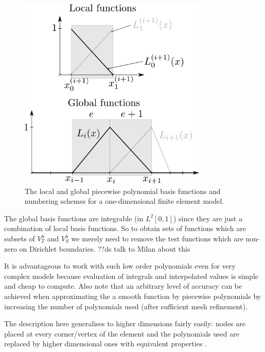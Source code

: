 \begin{figure}
  \center
  \includegraphics[width=0.8\textwidth]{./images/local_global_functions}
  \caption{The local and global piecewise polynomial basis functions and numbering schemes for a one-dimensional finite element model.   %
  }
  \label{fig:local_global_functions}
\end{figure}

The global basis functions are integrable (\ie in $L^2[0,1]$) since they are just a combination of local basis functions.
So to obtain sets of functions which are subsets of $V_T^h$ and $V_S^h$ we merely need to remove the test functions which are non-zero on Dirichlet boundaries.
??ds talk to Milan about this

It is advantageous to work with such low order polynomials even for very complex models because evaluation of integrals and interpolated values is simple and cheap to compute.
Also note that an arbitrary level of accuracy can be achieved when approximating the a smooth function by piecewise polynomials by increasing the number of polynomials used (\ie after sufficient mesh refinement).

The description here generalises to higher dimensions fairly easily: nodes are placed at every corner/vertex of the element and the polynomials used are replaced by higher dimensional ones with equivalent properties \cite[20]{HowardElmanDavidSilvester2006}.

